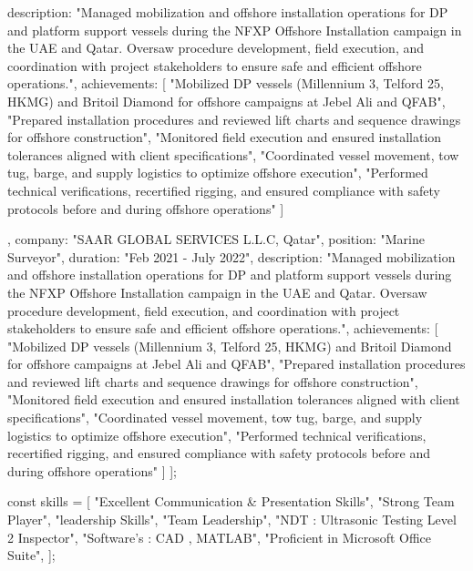 {{      description: "Managed mobilization and offshore installation operations for DP and platform support vessels during the NFXP Offshore Installation campaign in the UAE and Qatar. Oversaw procedure development, field execution, and coordination with project stakeholders to ensure safe and efficient offshore operations.",
      achievements: [
          "Mobilized DP vessels (Millennium 3, Telford 25, HKMG) and Britoil Diamond for offshore campaigns at Jebel Ali and QFAB",
          "Prepared installation procedures and reviewed lift charts and sequence drawings for offshore construction",
          "Monitored field execution and ensured installation tolerances aligned with client specifications",
          "Coordinated vessel movement, tow tug, barge, and supply logistics to optimize offshore execution",
          "Performed technical verifications, recertified rigging, and ensured compliance with safety protocols before and during offshore operations"
      ]
      
      
    },
    {
      company: "SAAR GLOBAL SERVICES L.L.C, Qatar",
      position: "Marine Surveyor",
      duration: "Feb 2021 - July 2022",
      description: "Managed mobilization and offshore installation operations for DP and platform support vessels during the NFXP Offshore Installation campaign in the UAE and Qatar. Oversaw procedure development, field execution, and coordination with project stakeholders to ensure safe and efficient offshore operations.",
      achievements: [
          "Mobilized DP vessels (Millennium 3, Telford 25, HKMG) and Britoil Diamond for offshore campaigns at Jebel Ali and QFAB",
          "Prepared installation procedures and reviewed lift charts and sequence drawings for offshore construction",
          "Monitored field execution and ensured installation tolerances aligned with client specifications",
          "Coordinated vessel movement, tow tug, barge, and supply logistics to optimize offshore execution",
          "Performed technical verifications, recertified rigging, and ensured compliance with safety protocols before and during offshore operations"
        ]
      }
  ];
  
  const skills = [
    "Excellent Communication & Presentation Skills",
    "Strong Team Player",
    "leadership Skills",
    "Team Leadership",
    "NDT : Ultrasonic Testing Level 2 Inspector",
    "Software's : CAD , MATLAB",
    "Proficient in Microsoft Office Suite",
  ];
  
}
